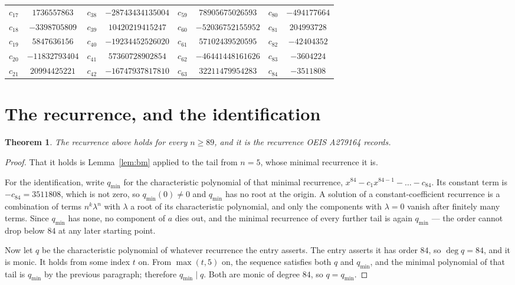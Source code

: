 \documentclass[11pt,a4paper]{article}
\theoremstyle{plain}
\newtheorem{theorem}{Theorem}
\theoremstyle{definition}
\begin{document}
\begin{center}
\begin{tabular}{cccccccc}
$c_{17}$ & $1736557863$ & $c_{38}$ & $-28743434135004$ & $c_{59}$ & $78905675026593$ & $c_{80}$ & $-494177664$ \\
$c_{18}$ & $-3398705809$ & $c_{39}$ & $10420219415247$ & $c_{60}$ & $-52036752155952$ & $c_{81}$ & $204993728$ \\
$c_{19}$ & $5847636156$ & $c_{40}$ & $-19234452526020$ & $c_{61}$ & $57102439520595$ & $c_{82}$ & $-42404352$ \\
$c_{20}$ & $-11832793404$ & $c_{41}$ & $57360728902854$ & $c_{62}$ & $-46441448161626$ & $c_{83}$ & $-3604224$ \\
$c_{21}$ & $20994425221$ & $c_{42}$ & $-16747937817810$ & $c_{63}$ & $32211479954283$ & $c_{84}$ & $-3511808$ \\
\end{tabular}
\end{center}

\section{The recurrence, and the identification}

\begin{theorem}
The recurrence above holds for every $n\ge89$, and it is the recurrence OEIS A279164 records.
\end{theorem}

\begin{proof}
That it holds is Lemma~\ref{lem:bm} applied to the tail from $n=5$, whose minimal
recurrence it is.

For the identification, write $q_{\min}$ for the characteristic polynomial of that minimal
recurrence, $x^{84}-c_1x^{84-1}-\dots-c_{84}$. Its constant term is
$-c_{84}=3511808$, which is not zero, so $q_{\min}(0)\neq0$ and $q_{\min}$ has no
root at the origin. A solution of a constant-coefficient recurrence is a combination of terms
$n^{k}\lambda^{n}$ with $\lambda$ a root of its characteristic polynomial, and only the
components with $\lambda=0$ vanish after finitely many terms. Since $q_{\min}$ has none, no
component of $a$ dies out, and the minimal recurrence of every further tail is again
$q_{\min}$ --- the order cannot drop below $84$ at any later starting point.

Now let $q$ be the characteristic polynomial of whatever recurrence the entry asserts. The
entry asserts it has order $84$, so $\deg q=84$, and it is monic. It holds from some
index $t$ on. From $\max(t,5)$ on, the sequence satisfies both $q$ and $q_{\min}$, and
the minimal polynomial of that tail is $q_{\min}$ by the previous paragraph; therefore
$q_{\min}\mid q$. Both are monic of degree $84$, so $q=q_{\min}$.
\end{proof}
\end{document}
